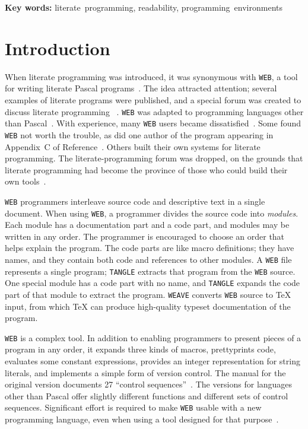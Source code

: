 \ifx\tr\undefined
\begin{center}\small
{\bf Key words:}
literate~programming, readability, programming~environments
\end{center}
\fi

\section{Introduction}
When literate programming was
introduced, it was synonymous with {\tt WEB}, a tool
for writing literate Pascal programs~\cite[Chapter~4]{knuth:literate:book}.
The idea attracted attention; several examples of literate
programs were published, and a special forum was created to discuss literate
programming~%
\cite{denning:announcing}. %
{\tt WEB} was  adapted to programming languages other than
Pascal~\cite{levy:cweb,ramsey:building,thimbleby:cweb}. %
%
With experience, many {\tt WEB} users became dissatisfied~\cite{ramsey:literate}. 
Some found {\tt WEB} not worth the trouble, as did
one author of the program appearing in Appendix~C
of Reference~.
Others built their own systems for literate
 programming.  %
The literate-programming forum was dropped, on the grounds that
literate programming had become the province of those who could build
their own tools~\cite{cvw:assessment}.

{\tt WEB}  programmers
 interleave source code and descriptive text in a single document.
When using {\tt WEB}, a programmer divides the source code into
{\em modules}.
Each module has a documentation part and a code part, and
modules may be written in any order.
The programmer is encouraged to choose an order that helps explain the program.
The code parts are like macro definitions;  they have names, and they contain
both code and references to other modules.
A {\tt WEB} file represents a single program;
{\tt TANGLE}  extracts that program from the {\tt WEB} source. 
One special module has a code part with no name, and {\tt TANGLE}
expands the code part of that module to extract the program.
{\tt WEAVE} converts {\tt WEB} source to
{\TeX} input, from which {\TeX} can produce high-quality typeset
documentation of the program.


{\tt WEB} is a complex tool.
In addition to enabling programmers to present pieces of a program in
any order, it expands three kinds of macros, prettyprints code,
evaluates some constant expressions,
provides an integer representation for string literals, and implements
a simple form of version control.
The manual for the original version documents 27 ``control sequences''~\cite{knuth:web}.
The versions for languages other than Pascal offer slightly different
functions and different sets of control sequences.
Significant effort is required to make {\tt WEB} usable with a new
programming language, even when using a tool designed for that
purpose~\cite{ramsey:building}. 

